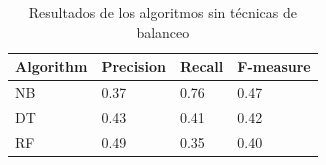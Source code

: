 \begin{table}[H]
\centering
\captionsetup{labelsep=period, labelfont=bf}
\caption{Resultados de los algoritmos sin técnicas de balanceo}
\fontsize{12pt}{10pt}\selectfont
\begin{tabular}{llll}
\toprule 
\textbf{Algorithm} & \textbf{Precision} & \textbf{Recall} & \textbf{F-measure} \\ 
\midrule 
NB & 0.37 & 0.76 & 0.47 \\ 
DT & 0.43 & 0.41 & 0.42 \\ 
RF & 0.49 & 0.35 & 0.40 \\ 
\bottomrule
\end{tabular}

\label{tab:none_results}
\end{table}
